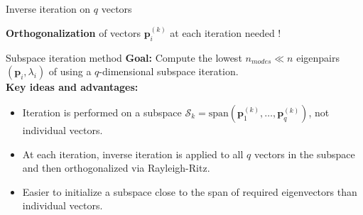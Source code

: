 \documentclass[aspectratio=169]{beamer}
\begin{document}
{\begin{frame}{Inverse iteration on \( q \) vectors}
  \begin{tcolorbox}[colback=darkred!10,colframe=darkred!40!black]
    \begin{center}
      \textbf{Orthogonalization} of vectors \(\mathbf p_i^{(k)} \) at each iteration needed !
    \end{center}
  \end{tcolorbox}
\end{frame}

\begin{frame}{Subspace iteration method}
  \small
  \textbf{Goal:} Compute the lowest \(n_{modes} \ll n\) eigenpairs \((\mathbf p_i, \lambda_i)\) of using a \(q\)-dimensional subspace iteration.\\[1mm]

  \textbf{Key ideas and advantages:}
  \begin{itemize}
    \item Iteration is performed on a subspace \(\mathcal S_k = \text{span}(\mathbf p_1^{(k)},\dots,\mathbf p_q^{(k)})\), not individual vectors.
    \item At each iteration, inverse iteration is applied to all \(q\) vectors in the subspace and then orthogonalized via Rayleigh-Ritz.
    \item Easier to initialize a subspace close to the span of required eigenvectors than individual vectors.
  \end{itemize}
  \begin{center}
\end{center}
\end{frame}}
\end{document}
